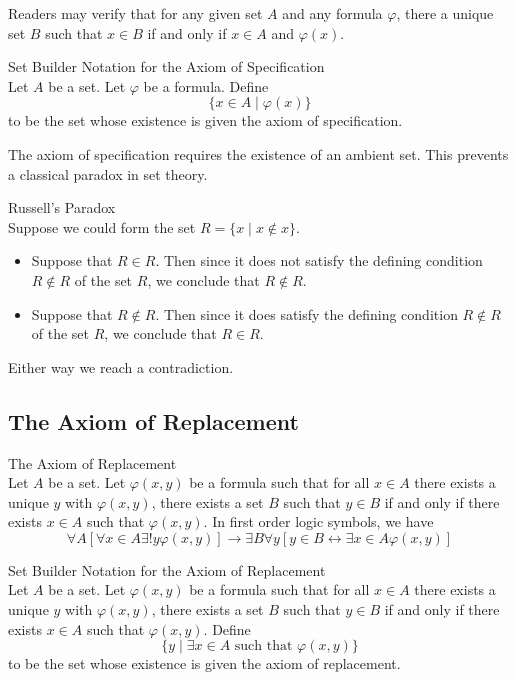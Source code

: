 \documentclass[a4paper]{article}
\begin{document}
Readers may verify that for any given set $A$ and any formula $\varphi$, there a unique set $B$ such that $x\in B$ if and only if $x\in A$ and $\varphi(x)$. 

\begin{defn}{Set Builder Notation for the Axiom of Specification}{}\\
Let $A$ be a set. Let $\varphi$ be a formula. Define $$\{x\in A\;|\;\varphi(x)\}$$ to be the set whose existence is given the axiom of specification. 
\end{defn}

The axiom of specification requires the existence of an ambient set. This prevents a classical paradox in set theory. 

\begin{eg}{Russell's Paradox}{}\\
Suppose we could form the set $R=\{x\;|\;x\notin x\}$. 
\begin{itemize}
\item Suppose that $R\in R$. Then since it does not satisfy the defining condition $R\notin R$ of the set $R$, we conclude that $R\notin R$. 
\item Suppose that $R\notin R$. Then since it does satisfy the defining condition $R\notin R$ of the set $R$, we conclude that $R\in R$. 
\end{itemize}
Either way we reach a contradiction. 
\end{eg}

\subsection{The Axiom of Replacement}
\begin{axm}{The Axiom of Replacement}{}\\
Let $A$ be a set. Let $\varphi(x,y)$ be a formula such that for all $x\in A$ there exists a unique $y$ with $\varphi(x,y)$, there exists a set $B$ such that $y\in B$ if and only if there exists $x\in A$ such that $\varphi(x,y)$. In first order logic symbols, we have $$\forall A\left[\forall x\in A\exists!y\varphi(x,y)\right]\to\exists B\forall y\left[y\in B\leftrightarrow\exists x\in A\varphi(x,y)\right]$$
\end{axm}

\begin{defn}{Set Builder Notation for the Axiom of Replacement}{}\\
Let $A$ be a set. Let $\varphi(x,y)$ be a formula such that for all $x\in A$ there exists a unique $y$ with $\varphi(x,y)$, there exists a set $B$ such that $y\in B$ if and only if there exists $x\in A$ such that $\varphi(x,y)$. Define $$\{y\;|\;\exists x\in A\text{ such that }\varphi(x,y)\}$$ to be the set whose existence is given the axiom of replacement. 
\end{defn}
\end{document}
